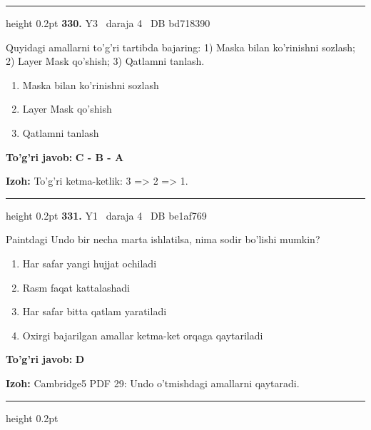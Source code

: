 \documentclass[10pt,a4paper,oneside]{article}
\begin{document}
\vspace{2mm}\hrule height 0.2pt \vspace{4mm}
\hypertarget{q330}{\textbf{\color{ink}330.}}  {\color{muted}\scriptsize Y3 \textbullet\ daraja 4 \textbullet\ DB bd718390}
\par
Quyidagi amallarni to'g'ri tartibda bajaring: 1) Maska bilan ko'rinishni sozlash; 2) Layer Mask qo'shish; 3) Qatlamni tanlash.
\begin{enumerate}[label=\Alph*),leftmargin=9mm]
\item Maska bilan ko'rinishni sozlash
\item Layer Mask qo'shish
\item Qatlamni tanlash
\end{enumerate}
\begin{tcolorbox}[enhanced,breakable,colback=teal!4,colframe=teal!45!black,boxrule=0.45pt,arc=1.2mm,left=2.8mm,right=2.8mm,top=2mm,bottom=2mm,before skip=2mm,after skip=2mm]
\textbf{\color{teal}To'g'ri javob:} \textbf{C - B - A}
\par\smallskip
\textbf{Izoh:} To'g'ri ketma-ketlik: 3 =\textgreater{} 2 =\textgreater{} 1.
\end{tcolorbox}
\vspace{2mm}\hrule height 0.2pt \vspace{4mm}
\hypertarget{q331}{\textbf{\color{ink}331.}}  {\color{muted}\scriptsize Y1 \textbullet\ daraja 4 \textbullet\ DB be1af769}
\par
Paintdagi Undo bir necha marta ishlatilsa, nima sodir bo'lishi mumkin?
\begin{enumerate}[label=\Alph*),leftmargin=9mm]
\item Har safar yangi hujjat ochiladi
\item Rasm faqat kattalashadi
\item Har safar bitta qatlam yaratiladi
\item Oxirgi bajarilgan amallar ketma-ket orqaga qaytariladi
\end{enumerate}
\begin{tcolorbox}[enhanced,breakable,colback=teal!4,colframe=teal!45!black,boxrule=0.45pt,arc=1.2mm,left=2.8mm,right=2.8mm,top=2mm,bottom=2mm,before skip=2mm,after skip=2mm]
\textbf{\color{teal}To'g'ri javob:} \textbf{D}
\par\smallskip
\textbf{Izoh:} Cambridge5 PDF 29: Undo o'tmishdagi amallarni qaytaradi.
\end{tcolorbox}
\vspace{2mm}\hrule height 0.2pt \vspace{4mm}
\end{document}
